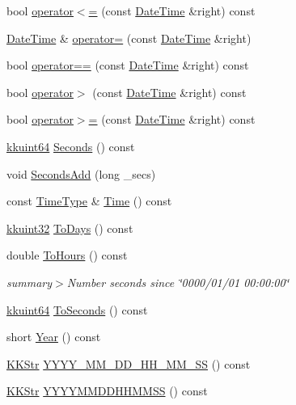 \begin{DoxyCompactItemize}
\item 
bool \hyperlink{class_k_k_b_1_1_date_time_a8c908bd1fefa7152856936e3b9336f64}{operator$<$=} (const \hyperlink{class_k_k_b_1_1_date_time}{Date\+Time} \&right) const 
\item 
\hyperlink{class_k_k_b_1_1_date_time}{Date\+Time} \& \hyperlink{class_k_k_b_1_1_date_time_a16e05498069aca8c6bd510a68b2bee69}{operator=} (const \hyperlink{class_k_k_b_1_1_date_time}{Date\+Time} \&right)
\item 
bool \hyperlink{class_k_k_b_1_1_date_time_a1be303a5cb29cfd06c6de9562e454eba}{operator==} (const \hyperlink{class_k_k_b_1_1_date_time}{Date\+Time} \&right) const 
\item 
bool \hyperlink{class_k_k_b_1_1_date_time_a7ac966a3cb35eed48e6ce09265ea4a84}{operator$>$} (const \hyperlink{class_k_k_b_1_1_date_time}{Date\+Time} \&right) const 
\item 
bool \hyperlink{class_k_k_b_1_1_date_time_a19ff014e57d8d03d97e3b5a57f6ac036}{operator$>$=} (const \hyperlink{class_k_k_b_1_1_date_time}{Date\+Time} \&right) const 
\item 
\hyperlink{namespace_k_k_b_a1f2b0568d3b63cc7697dcff73250113e}{kkuint64} \hyperlink{class_k_k_b_1_1_date_time_a051f9f993938d58e5762256cf5c06f31}{Seconds} () const 
\item 
void \hyperlink{class_k_k_b_1_1_date_time_a0ca7d0cc7a5634c4c975fd16bbb41b32}{Seconds\+Add} (long \+\_\+secs)
\item 
const \hyperlink{class_k_k_b_1_1_time_type}{Time\+Type} \& \hyperlink{class_k_k_b_1_1_date_time_a981ba2e8e1ca8319d51be65c746442e1}{Time} () const 
\item 
\hyperlink{namespace_k_k_b_af8d832f05c54994a1cce25bd5743e19a}{kkuint32} \hyperlink{class_k_k_b_1_1_date_time_a92e8292a86720233831e6433df092fb5}{To\+Days} () const 
\item 
double \hyperlink{class_k_k_b_1_1_date_time_a1245f39d8c4209cf226c73de7950c426}{To\+Hours} () const 
\begin{DoxyCompactList}\small\item\em summary$>$Number seconds since \char`\"{}0000/01/01 00\+:00\+:00\char`\"{}\end{DoxyCompactList}\item 
\hyperlink{namespace_k_k_b_a1f2b0568d3b63cc7697dcff73250113e}{kkuint64} \hyperlink{class_k_k_b_1_1_date_time_a32ae25734d45d75f34a5dd0db163d57d}{To\+Seconds} () const 
\item 
short \hyperlink{class_k_k_b_1_1_date_time_aedfb008b85fd86fd6cec7d664ffac585}{Year} () const 
\item 
\hyperlink{class_k_k_b_1_1_k_k_str}{K\+K\+Str} \hyperlink{class_k_k_b_1_1_date_time_aca57fbdcd040549a2c9e0a3d4e99b9f9}{Y\+Y\+Y\+Y\+\_\+\+M\+M\+\_\+\+D\+D\+\_\+\+H\+H\+\_\+\+M\+M\+\_\+\+SS} () const 
\item 
\hyperlink{class_k_k_b_1_1_k_k_str}{K\+K\+Str} \hyperlink{class_k_k_b_1_1_date_time_ae8cb83aa1fe9cf1bf1694413055ea433}{Y\+Y\+Y\+Y\+M\+M\+D\+D\+H\+H\+M\+M\+SS} () const 
\end{DoxyCompactItemize}


